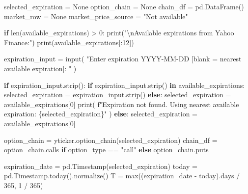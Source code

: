 \documentclass[
  11pt,
]{article}
\newenvironment{Shaded}{}{}
\newcommand{\BuiltInTok}[1]{\textcolor[rgb]{0.00,0.50,0.00}{#1}}
\newcommand{\CharTok}[1]{\textcolor[rgb]{0.25,0.44,0.63}{#1}}
\newcommand{\ControlFlowTok}[1]{\textcolor[rgb]{0.00,0.44,0.13}{\textbf{#1}}}
\newcommand{\DecValTok}[1]{\textcolor[rgb]{0.25,0.63,0.44}{#1}}
\newcommand{\KeywordTok}[1]{\textcolor[rgb]{0.00,0.44,0.13}{\textbf{#1}}}
\newcommand{\NormalTok}[1]{#1}
\newcommand{\OperatorTok}[1]{\textcolor[rgb]{0.40,0.40,0.40}{#1}}
\newcommand{\SpecialCharTok}[1]{\textcolor[rgb]{0.25,0.44,0.63}{#1}}
\newcommand{\SpecialStringTok}[1]{\textcolor[rgb]{0.73,0.40,0.53}{#1}}
\newcommand{\StringTok}[1]{\textcolor[rgb]{0.25,0.44,0.63}{#1}}
\newcommand{\VariableTok}[1]{\textcolor[rgb]{0.10,0.09,0.49}{#1}}
\begin{document}
\begin{Shaded}
\begin{Highlighting}[]
\NormalTok{selected\_expiration }\OperatorTok{=} \VariableTok{None}
\NormalTok{option\_chain }\OperatorTok{=} \VariableTok{None}
\NormalTok{chain\_df }\OperatorTok{=}\NormalTok{ pd.DataFrame()}
\NormalTok{market\_row }\OperatorTok{=} \VariableTok{None}
\NormalTok{market\_price\_source }\OperatorTok{=} \StringTok{"Not available"}

\ControlFlowTok{if} \BuiltInTok{len}\NormalTok{(available\_expirations) }\OperatorTok{\textgreater{}} \DecValTok{0}\NormalTok{:}
    \BuiltInTok{print}\NormalTok{(}\StringTok{"}\CharTok{\textbackslash{}n}\StringTok{Available expirations from Yahoo Finance:"}\NormalTok{)}
    \BuiltInTok{print}\NormalTok{(available\_expirations[:}\DecValTok{12}\NormalTok{])}

\NormalTok{    expiration\_input }\OperatorTok{=} \BuiltInTok{input}\NormalTok{(}
        \StringTok{"Enter expiration YYYY{-}MM{-}DD [blank = nearest available expiration]: "}
\NormalTok{    )}

    \ControlFlowTok{if}\NormalTok{ expiration\_input.strip():}
        \ControlFlowTok{if}\NormalTok{ expiration\_input.strip() }\KeywordTok{in}\NormalTok{ available\_expirations:}
\NormalTok{            selected\_expiration }\OperatorTok{=}\NormalTok{ expiration\_input.strip()}
        \ControlFlowTok{else}\NormalTok{:}
\NormalTok{            selected\_expiration }\OperatorTok{=}\NormalTok{ available\_expirations[}\DecValTok{0}\NormalTok{]}
            \BuiltInTok{print}\NormalTok{(}
                \SpecialStringTok{f"Expiration not found. Using nearest available expiration: }\SpecialCharTok{\{}\NormalTok{selected\_expiration}\SpecialCharTok{\}}\SpecialStringTok{"}
\NormalTok{            )}
    \ControlFlowTok{else}\NormalTok{:}
\NormalTok{        selected\_expiration }\OperatorTok{=}\NormalTok{ available\_expirations[}\DecValTok{0}\NormalTok{]}

\NormalTok{    option\_chain }\OperatorTok{=}\NormalTok{ yticker.option\_chain(selected\_expiration)}
\NormalTok{    chain\_df }\OperatorTok{=}\NormalTok{ option\_chain.calls }\ControlFlowTok{if}\NormalTok{ option\_type }\OperatorTok{==} \StringTok{"call"} \ControlFlowTok{else}\NormalTok{ option\_chain.puts}

\NormalTok{    expiration\_date }\OperatorTok{=}\NormalTok{ pd.Timestamp(selected\_expiration)}
\NormalTok{    today }\OperatorTok{=}\NormalTok{ pd.Timestamp.today().normalize()}
\NormalTok{    T }\OperatorTok{=} \BuiltInTok{max}\NormalTok{((expiration\_date }\OperatorTok{{-}}\NormalTok{ today).days }\OperatorTok{/} \DecValTok{365}\NormalTok{, }\DecValTok{1} \OperatorTok{/} \DecValTok{365}\NormalTok{)}


\end{Highlighting}
\end{Shaded}
\end{document}
